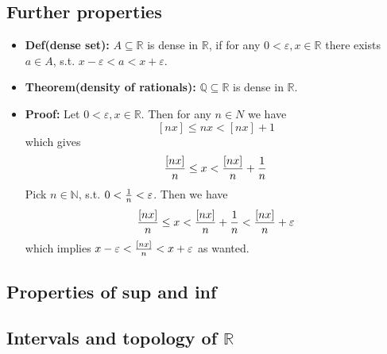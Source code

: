 \documentclass{article}
\begin{document}
\subsection{Further properties}

\begin{itemize}
\item \textbf{Def(dense set):} $A\subseteq \mathbb{R}$ is dense in $\mathbb{R}$, if for any $0<\varepsilon, x\in \mathbb{R}$ there exists $a\in A$, s.t. $x-\varepsilon<a<x+\varepsilon$.

\item \textbf{Theorem(density of rationals):} $\mathbb{Q\subseteq\mathbb{R}}$ is dense in $\mathbb{R}$.

\item \textbf{Proof:} Let $0<\varepsilon, x\in \mathbb{R}$. Then for any $n\in N$ we have 
\[
[nx]\leq nx<[nx] + 1
\]
which gives
\[
{[nx]\over n}\leq x <{[nx]\over n} + {1\over n}
\]
Pick $n\in \mathbb{N}$, s.t. $0<{1\over n}<\varepsilon$. Then we have
\[
{[nx]\over n}\leq x <{[nx]\over n} +{1\over n}<{[nx]\over n} +\varepsilon
\]
which implies $x-\varepsilon<{[nx]\over n} <x+\varepsilon$ as wanted.
\end{itemize}

\subsection{Properties of sup and inf}


\subsection{\texorpdfstring{Intervals and topology of $\mathbb{R}$}{Intervals and topology of R}}
\end{document}
